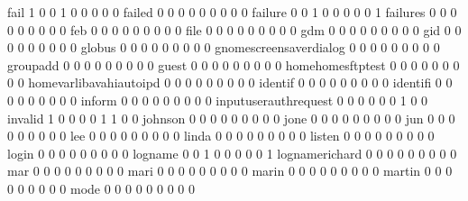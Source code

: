 \documentclass[compress,8pt]{beamer}
\begin{document}
\begin{frame}
\begin{Schunk}
  fail                                       1   0   0   1   0   0   0   0   0
  failed                                     0   0   0   0   0   0   0   0   0
  failure                                    0   0   1   0   0   0   0   0   1
  failures                                   0   0   0   0   0   0   0   0   0
  feb                                        0   0   0   0   0   0   0   0   0
  file                                       0   0   0   0   0   0   0   0   0
  gdm                                        0   0   0   0   0   0   0   0   0
  gid                                        0   0   0   0   0   0   0   0   0
  globus                                     0   0   0   0   0   0   0   0   0
  gnomescreensaverdialog                     0   0   0   0   0   0   0   0   0
  groupadd                                   0   0   0   0   0   0   0   0   0
  guest                                      0   0   0   0   0   0   0   0   0
  homehomesftptest                           0   0   0   0   0   0   0   0   0
  homevarlibavahiautoipd                     0   0   0   0   0   0   0   0   0
  identif                                    0   0   0   0   0   0   0   0   0
  identifi                                   0   0   0   0   0   0   0   0   0
  inform                                     0   0   0   0   0   0   0   0   0
  inputuserauthrequest                       0   0   0   0   0   0   1   0   0
  invalid                                    1   0   0   0   0   1   1   0   0
  johnson                                    0   0   0   0   0   0   0   0   0
  jone                                       0   0   0   0   0   0   0   0   0
  jun                                        0   0   0   0   0   0   0   0   0
  lee                                        0   0   0   0   0   0   0   0   0
  linda                                      0   0   0   0   0   0   0   0   0
  listen                                     0   0   0   0   0   0   0   0   0
  login                                      0   0   0   0   0   0   0   0   0
  logname                                    0   0   1   0   0   0   0   0   1
  lognamerichard                             0   0   0   0   0   0   0   0   0
  mar                                        0   0   0   0   0   0   0   0   0
  mari                                       0   0   0   0   0   0   0   0   0
  marin                                      0   0   0   0   0   0   0   0   0
  martin                                     0   0   0   0   0   0   0   0   0
  mode                                       0   0   0   0   0   0   0   0   0

\end{Schunk}
\end{frame}
\end{document}
